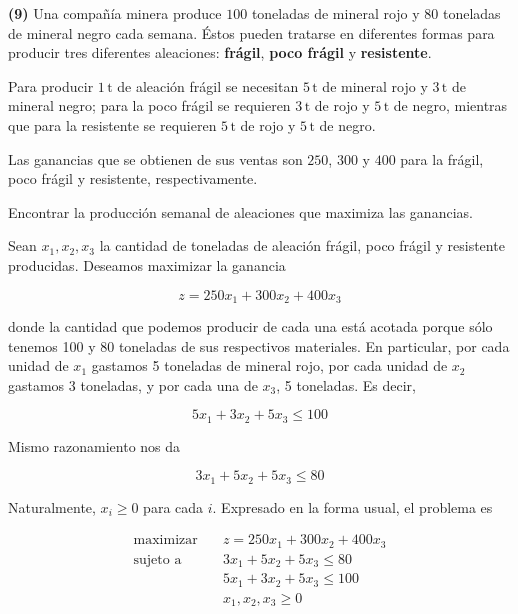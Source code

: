 \documentclass[12pt]{article}
\begin{document}
\pagebreak 

\begin{myframe}
\textbf{(9)} Una compañía minera produce $100$ toneladas de mineral rojo y $80$
toneladas de mineral negro cada semana. Éstos pueden tratarse en diferentes
formas para producir tres diferentes aleaciones: \textbf{frágil}, \textbf{poco
frágil} y \textbf{resistente}.

Para producir $1\,\mathrm{t}$ de aleación frágil se necesitan $5\,\mathrm{t}$ de
mineral rojo y $3\,\mathrm{t}$ de mineral negro; para la poco frágil se
requieren $3\,\mathrm{t}$ de rojo y $5\,\mathrm{t}$ de negro, mientras que para
la resistente se requieren $5\,\mathrm{t}$ de rojo y $5\,\mathrm{t}$ de negro.

Las ganancias que se obtienen de sus ventas son $250$, $300$ y $400$ para la
frágil, poco frágil y resistente, respectivamente.

Encontrar la producción semanal de aleaciones que maximiza las ganancias.
\end{myframe}

Sean $x_1, x_2, x_3$  la cantidad de toneladas de aleación frágil, poco frágil y
resistente producidas. Deseamos maximizar la ganancia 

\begin{equation*}
    z = 250x_1 + 300x_2 + 400x_3
\end{equation*}

donde la cantidad que podemos producir de cada una está acotada porque sólo
tenemos 100 y 80 toneladas de sus respectivos materiales. En particular, por
cada unidad de $x_1$ gastamos 5 toneladas de mineral rojo, por cada unidad de
$x_2$ gastamos 3 toneladas, y por cada una de $x_3$, 5 toneladas. Es decir, 

\begin{equation*}
    5x_1 + 3x_2 + 5x_3 \leq 100
\end{equation*}

Mismo razonamiento nos da 

\begin{equation*}
    3x_1 + 5x_2 + 5x_3 \leq 80
\end{equation*}

Naturalmente, $x_i \geq 0$ para cada $i$. Expresado en la forma usual, el
problema es 

\[
\begin{aligned}
\text{maximizar} \quad & z = 250x_1 + 300x_2 + 400x_3 \\
\text{sujeto a} \quad
& 3x_1 + 5x_2 + 5x_3 \leq 80 \\
& 5x_1 + 3x_2 + 5x_3 \leq 100\\
& x_1,x_2,x_3 \geq 0
\end{aligned}
\]
\end{document}
